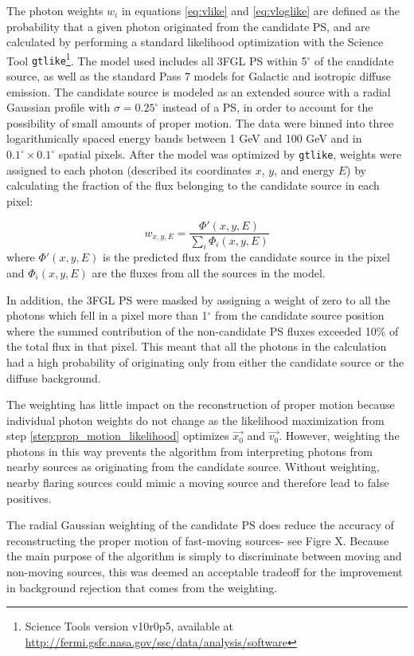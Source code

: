 The photon weights $w_i$ in equations \ref{eq:vlike} and \ref{eq:vloglike} are defined as the probability that a given photon originated from the candidate PS, and are calculated by performing a standard likelihood optimization with the \Fermi Science Tool {\tt gtlike}\footnote{Science Tools version v10r0p5, available at \url{http://fermi.gsfc.nasa.gov/ssc/data/analysis/software}}.
The model used includes all 3FGL PS within 5$^\circ$ of the candidate source, as well as the standard Pass 7 models for Galactic and isotropic diffuse emission.
The candidate source is modeled as an extended source with a radial Gaussian profile with $\sigma=0.25^\circ$ instead of a PS, in order to account for the possibility of small amounts of proper motion.
The data were binned into three logarithmically spaced energy bands between 1 GeV and 100 GeV and in $0.1^\circ \times 0.1^\circ$ spatial pixels.
After the model was optimized by {\tt gtlike}, weights were assigned to each photon (described its coordinates $x$, $y$, and energy $E$) by calculating the fraction of the flux belonging to the candidate source in each pixel:

\begin{equation}
w_{x,y,E} = \frac{\Phi'(x,y,E)}{\sum_i \Phi_i(x,y,E)}
\end{equation}
where $\Phi'(x,y,E)$ is the predicted flux from the candidate source in the pixel and $\Phi_i(x,y,E)$ are the fluxes from all the sources in the model.

In addition, the 3FGL PS were masked by assigning a weight of zero to all the photons which fell in a pixel more than 1$^\circ$ from the candidate source position where the summed contribution of the non-candidate PS fluxes exceeded 10\% of the total flux in that pixel.
This meant that all the photons in the calculation had a high probability of originating only from either the candidate source or the diffuse background.

The weighting has little impact on the reconstruction of proper motion because individual photon weights do not change as the likelihood maximization from step \ref{step:prop_motion_likelihood} optimizes $\vec{x_0}$ and $\vec{v_0}$.
However, weighting the photons in this way prevents the algorithm from interpreting photons from nearby sources as originating from the candidate source.
Without weighting, nearby flaring sources could mimic a moving source and therefore lead to false positives.

The radial Gaussian weighting of the candidate PS does reduce the accuracy of reconstructing the proper motion of fast-moving sources- see Figre X.
Because the main purpose of the algorithm is simply to discriminate between moving and non-moving sources, this was deemed an acceptable tradeoff for the improvement in background rejection that comes from the weighting.

